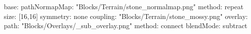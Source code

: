 base:
  pathNormapMap: "Blocks/Terrain/stone_normalmap.png"
  method: repeat
  size: [16,16]
  symmetry: none
  coupling: "Blocks/Terrain/stone_mossy.png"
overlay:
  path: "Blocks/Overlays/_sub_overlay.png"
  method: connect
  blendMode: subtract